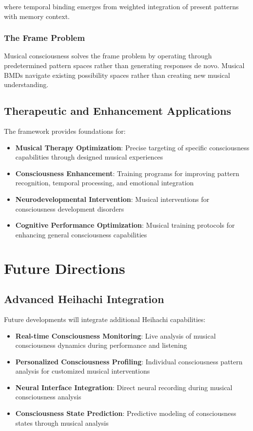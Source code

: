 \documentclass[12pt,a4paper]{article}
\begin{document}
where temporal binding emerges from weighted integration of present patterns with memory context.

\subsubsection{The Frame Problem}

Musical consciousness solves the frame problem by operating through predetermined pattern spaces rather than generating responses de novo. Musical BMDs navigate existing possibility spaces rather than creating new musical understanding.

\subsection{Therapeutic and Enhancement Applications}

The framework provides foundations for:

\begin{itemize}
\item \textbf{Musical Therapy Optimization}: Precise targeting of specific consciousness capabilities through designed musical experiences
\item \textbf{Consciousness Enhancement}: Training programs for improving pattern recognition, temporal processing, and emotional integration
\item \textbf{Neurodevelopmental Intervention}: Musical interventions for consciousness development disorders
\item \textbf{Cognitive Performance Optimization}: Musical training protocols for enhancing general consciousness capabilities
\end{itemize}

\section{Future Directions}

\subsection{Advanced Heihachi Integration}

Future developments will integrate additional Heihachi capabilities:

\begin{itemize}
\item \textbf{Real-time Consciousness Monitoring}: Live analysis of musical consciousness dynamics during performance and listening
\item \textbf{Personalized Consciousness Profiling}: Individual consciousness pattern analysis for customized musical interventions
\item \textbf{Neural Interface Integration}: Direct neural recording during musical consciousness analysis
\item \textbf{Consciousness State Prediction}: Predictive modeling of consciousness states through musical analysis
\end{itemize}
\end{document}
